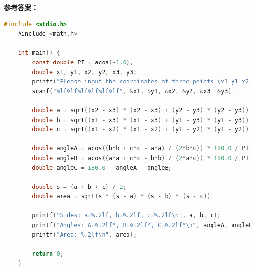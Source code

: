 \documentclass[lang=cn,newtx,10pt,scheme=chinese]{elegantbook}
\begin{document}
\newpage

\textbf{参考答案：}

\begin{lstlisting}[language=C]
    #include <stdio.h>
    #include <math.h>

    int main() {
        const double PI = acos(-1.0);
        double x1, y1, x2, y2, x3, y3;
        printf("Please input the coordinates of three points (x1 y1 x2 y2 x3 y3):");
        scanf("%lf%lf%lf%lf%lf%lf", &x1, &y1, &x2, &y2, &x3, &y3);

        double a = sqrt((x2 - x3) * (x2 - x3) + (y2 - y3) * (y2 - y3));
        double b = sqrt((x1 - x3) * (x1 - x3) + (y1 - y3) * (y1 - y3));
        double c = sqrt((x1 - x2) * (x1 - x2) + (y1 - y2) * (y1 - y2));

        double angleA = acos((b*b + c*c - a*a) / (2*b*c)) * 180.0 / PI;
        double angleB = acos((a*a + c*c - b*b) / (2*a*c)) * 180.0 / PI;
        double angleC = 180.0 - angleA - angleB;

        double s = (a + b + c) / 2;
        double area = sqrt(s * (s - a) * (s - b) * (s - c));

        printf("Sides: a=%.2lf, b=%.2lf, c=%.2lf\n", a, b, c);
        printf("Angles: A=%.2lf°, B=%.2lf°, C=%.2lf°\n", angleA, angleB, angleC);
        printf("Area: %.2lf\n", area);

        return 0;
    }
\end{lstlisting}
\end{document}

